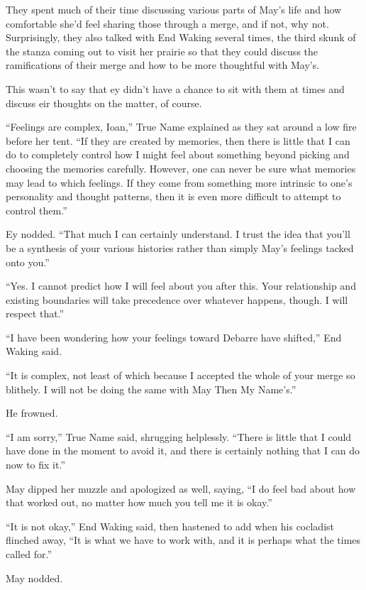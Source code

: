 They spent much of their time discussing various parts of May's life and how comfortable she'd feel sharing those through a merge, and if not, why not. Surprisingly, they also talked with End Waking several times, the third skunk of the stanza coming out to visit her prairie so that they could discuss the ramifications of their merge and how to be more thoughtful with May's.

This wasn't to say that ey didn't have a chance to sit with them at times and discuss eir thoughts on the matter, of course.

``Feelings are complex, Ioan,'' True Name explained as they sat around a low fire before her tent. ``If they are created by memories, then there is little that I can do to completely control how I might feel about something beyond picking and choosing the memories carefully. However, one can never be sure what memories may lead to which feelings. If they come from something more intrinsic to one's personality and thought patterns, then it is even more difficult to attempt to control them.''

Ey nodded. ``That much I can certainly understand. I trust the idea that you'll be a synthesis of your various histories rather than simply May's feelings tacked onto you.''

``Yes. I cannot predict how I will feel about you after this. Your relationship and existing boundaries will take precedence over whatever happens, though. I will respect that.''

``I have been wondering how your feelings toward Debarre have shifted,'' End Waking said.

``It is complex, not least of which because I accepted the whole of your merge so blithely. I will not be doing the same with May Then My Name's.''

He frowned.

``I am sorry,'' True Name said, shrugging helplessly. ``There is little that I could have done in the moment to avoid it, and there is certainly nothing that I can do now to fix it.''

May dipped her muzzle and apologized as well, saying, ``I do feel bad about how that worked out, no matter how much you tell me it is okay.''

``It is not okay,'' End Waking said, then hastened to add when his cocladist flinched away, ``It is what we have to work with, and it is perhaps what the times called for.''

May nodded.

